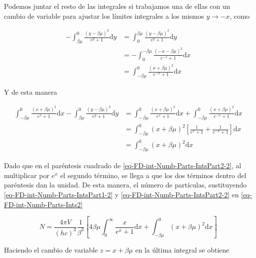 Podemos juntar el resto de las integrales si trabajamos una de ellas con un cambio de variable para ajustar los límites integrales a los mismos $y \rightarrow -x$, como

\begin{equation}
\begin{split}
- \int_{\beta \mu}^{0} \frac{(y -\beta \mu)^{2}}{{e}^{y}+1}  \mathrm{d}y & =  \int_{0}^{\beta \mu} \frac{(y -\beta \mu)^{2}}{{e}^{y}+1}  \mathrm{d}y \\
& = - \int_{0}^{-\beta \mu} \frac{(-x -\beta \mu)^{2}}{{e}^{-x}+1}  \mathrm{d}x \\
& = \int_{-\beta \mu}^{0} \frac{(x + \beta \mu)^{2}}{{e}^{-x}+1}  \mathrm{d}x
\end{split}
\end{equation}

Y de esta manera

\begin{equation}\label{eq-FD-int-Numb-Parts-IntsPart2-2}
\begin{split}
\int_{-\beta \mu}^{0} \frac{(x + \beta \mu)^{2}}{{e}^{x}+1}  \mathrm{d}x - \int_{\beta \mu}^{0} \frac{(y -\beta \mu)^{2}}{{e}^{y}+1}  \mathrm{d}y & = \int_{-\beta \mu}^{0} \frac{(x + \beta \mu)^{2}}{{e}^{x}+1}  \mathrm{d}x  +  \int_{-\beta \mu}^{0} \frac{(x + \beta \mu)^{2}}{{e}^{-x}+1}  \mathrm{d}x \\ 
& =  \int_{-\beta \mu}^{0} (x + \beta \mu)^{2} \left[\frac{1}{{e}^{x} + 1} + \frac{1}{{e}^{-x} + 1} \right] \mathrm{d}x \\
& = \int_{-\beta \mu}^{0} (x + \beta \mu)^{2} \mathrm{d}x
\end{split}
\end{equation}

Dado que en el paréntesis cuadrado de \eqref{eq-FD-int-Numb-Parts-IntsPart2-2}, al multiplicar por ${e}^{x}$ el segundo término, se llega a que los dos términos dentro del paréntesis dan la unidad. De esta manera, el número de partículas, sustituyendo \eqref{eq-FD-int-Numb-Parts-IntsPart1-2} y \eqref{eq-FD-int-Numb-Parts-IntsPart2-2} en \eqref{eq-FD-int-Numb-Parts-Ints2}

\begin{equation}
N = \frac{4 \pi V}{(hc)^{3}} \frac{1}{{\beta}^{3}} \left[4\beta \mu \int_{0}^{\infty} \frac{x}{{e}^{x} + 1} \mathrm{d} x + \int_{-\beta \mu}^{0} (x + \beta \mu)^{2} \mathrm{d}x \right]
\end{equation}

Haciendo el cambio de variable ${z} = x + \beta \mu$ en la última integral se obtiene

